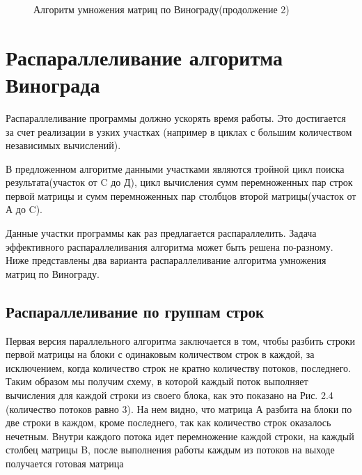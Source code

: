 \documentclass[12pt]{report}
\begin{document}
\newpage
\begin{figure}[h]
	\caption{Алгоритм умножения матриц по Винограду(продолжение 2)}
	\label{figure:image}
\end{figure}


\section{Распараллеливание алгоритма Винограда}
\qquad Распараллеливание программы должно ускорять время работы. Это достигается за счет реализации в узких участках (например в циклах с большим количеством независимых вычислений).

В предложенном алгоритме данными участками  являются тройной цикл поиска результата(участок от C до Д), цикл вычисления сумм перемноженных пар строк первой матрицы и  сумм перемноженных пар столбцов второй матрицы(участок от А до C).

Данные участки программы как раз предлагается распараллелить. Задача эффективного распараллеливания алгоритма может быть решена по-разному. Ниже представлены два варианта распараллеливание алгоритма умножения матриц по Винограду.

\subsection{Распараллеливание по группам строк}
\qquad Первая версия параллельного алгоритма заключается в том, чтобы разбить строки первой матрицы на блоки с одинаковым количеством строк в каждой, за исключением, когда количество строк не кратно количеству потоков, последнего. Таким образом мы получим схему, в которой каждый поток выполняет вычисления для каждой строки из своего блока, как это показано на Рис. 2.4 (количество потоков равно 3). На нем видно, что матрица А разбита на блоки по две строки в каждом, кроме последнего, так как количество строк оказалось нечетным. Внутри каждого потока идет перемножение каждой строки, на каждый столбец матрицы B, после выполнения работы каждым из потоков на выходе получается готовая матрица
\end{document}
